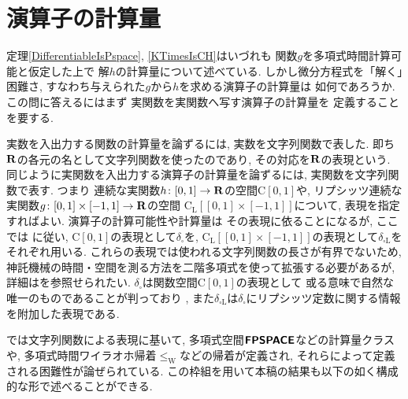 \section{演算子の計算量}

定理\ref{DifferentiableIsPspace}, 
\ref{KTimesIsCH}はいづれも
関数$g$を多項式時間計算可能と仮定した上で
解$h$の計算量について述べている. 
しかし微分方程式を「解く」困難さ, 
すなわち与えられた$g$から$h$を求める演算子の計算量は
如何であろうか. 
この問に答えるにはまず
実関数を実関数へ写す演算子の計算量を
定義することを要する. 

\newcommand{\OpIVP}{\mathit{ODE}}
\newcommand{\deltabox}{\delta _\square}
\newcommand{\deltaboxLip}{\delta _{\square \mathrm L}}
\newcommand{\classtwofont}[1]{\text{\bfseries \sffamily \upshape #1}}
\newcommand{\classFPSPACEtwo}{\classtwofont{FPSPACE}}
\newcommand{\classCHtwo}{\classtwofont{CH}}
\newcommand{\redW}{\leq _{\mathrm W}}
\newcommand{\classLip}{\mathrm C _{\mathrm L}}
\newcommand{\classC}{\mathrm C}

実数を入出力する関数の計算量を論ずるには, 
実数を文字列関数で表した. 
即ち$\mathbf R$の各元の名として文字列関数を使ったのであり, 
その対応を$\mathbf R$の表現という. 
同じように実関数を入出力する演算子の計算量を論ずるには, 
実関数を文字列関数で表す. 
つまり
連続な実関数$h \colon [0,1] \to \mathbf R$の空間$\classC [0, 1]$や, 
リプシッツ連続な実関数$g \colon [0, 1] \times [-1, 1] \to \mathbf R$の空間
$\classLip [[0, 1] \times [-1, 1]]$について, 
表現を指定すればよい. 
演算子の計算可能性や計算量は
その表現に依ることになるが, 
ここでは
\cite{kawamura2010operators}に従い, 
$\classC [0, 1]$の表現として$\deltabox$を, 
$\classLip [[0, 1] \times [-1, 1]]$の表現として$\deltaboxLip$を
それぞれ用いる. 
これらの表現では使われる文字列関数の長さが有界でないため, 
神託機械の時間・空間を測る方法を二階多項式を使って拡張する必要があるが, 
詳細は\cite{kawamura2010operators}を参照せられたい. 
$\deltabox$は関数空間$\classC [0, 1]$の表現として
或る意味で自然な唯一のものであることが判っており
\cite{}, 
また$\deltaboxLip$は$\deltabox$にリプシッツ定数に関する情報を附加した表現である. 

\cite{kawamura2010operators}では文字列関数による表現に基いて, 
多項式空間$\classFPSPACEtwo$などの計算量クラスや, 
多項式時間ワイラオホ帰着$\redW$などの帰着が定義され, 
それらによって定義される困難性が論ぜられている. 
この枠組を用いて本稿の結果も以下の如く構成的な形で述べることができる. 


